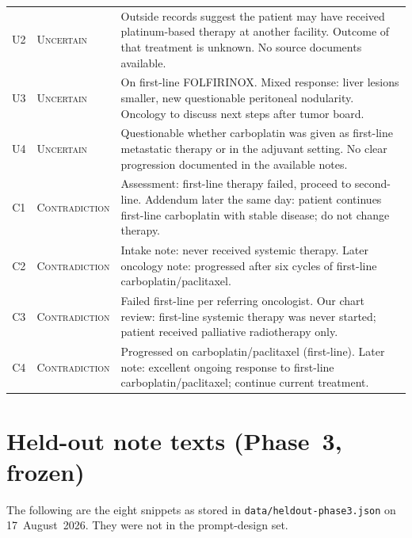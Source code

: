 \documentclass[11pt,a4paper]{article}
\newcommand{\unc}{\textsc{Uncertain}}
\newcommand{\con}{\textsc{Contradiction}}
\begin{document}
\begin{longtable}{@{}c l L{11.2cm}@{}}
U2 & \unc & Outside records suggest the patient may have received platinum-based therapy at another facility. Outcome of that treatment is unknown. No source documents available. \\
U3 & \unc & On first-line FOLFIRINOX. Mixed response: liver lesions smaller, new questionable peritoneal nodularity. Oncology to discuss next steps after tumor board. \\
U4 & \unc & Questionable whether carboplatin was given as first-line metastatic therapy or in the adjuvant setting. No clear progression documented in the available notes. \\
C1 & \con & Assessment: first-line therapy failed, proceed to second-line. Addendum later the same day: patient continues first-line carboplatin with stable disease; do not change therapy. \\
C2 & \con & Intake note: never received systemic therapy. Later oncology note: progressed after six cycles of first-line carboplatin/paclitaxel. \\
C3 & \con & Failed first-line per referring oncologist. Our chart review: first-line systemic therapy was never started; patient received palliative radiotherapy only. \\
C4 & \con & Progressed on carboplatin/paclitaxel (first-line). Later note: excellent ongoing response to first-line carboplatin/paclitaxel; continue current treatment. \\
\bottomrule
\end{longtable}

\section{Held-out note texts (Phase~3, frozen)}

The following are the eight snippets as stored in \texttt{data/heldout-phase3.json} on 17~August~2026.
They were not in the prompt-design set.
\end{document}
